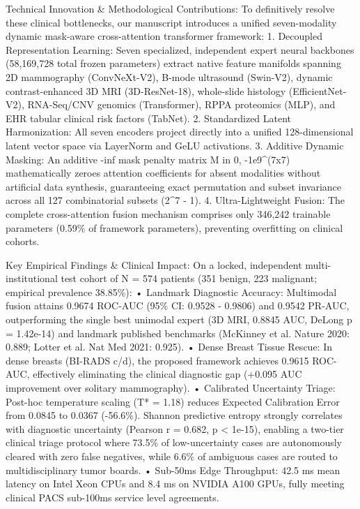 \documentclass[11pt]{article}
\begin{document}
Technical Innovation \& Methodological Contributions:
To definitively resolve these clinical bottlenecks, our manuscript introduces a unified seven-modality dynamic mask-aware cross-attention transformer framework:
1. Decoupled Representation Learning: Seven specialized, independent expert neural backbones (58,169,728 total frozen parameters) extract native feature manifolds spanning 2D mammography (ConvNeXt-V2), B-mode ultrasound (Swin-V2), dynamic contrast-enhanced 3D MRI (3D-ResNet-18), whole-slide histology (EfficientNet-V2), RNA-Seq/CNV genomics (Transformer), RPPA proteomics (MLP), and EHR tabular clinical risk factors (TabNet).
2. Standardized Latent Harmonization: All seven encoders project directly into a unified 128-dimensional latent vector space via LayerNorm and GeLU activations.
3. Additive Dynamic Masking: An additive -inf mask penalty matrix M in {0, -1e9}^(7x7) mathematically zeroes attention coefficients for absent modalities without artificial data synthesis, guaranteeing exact permutation and subset invariance across all 127 combinatorial subsets (2^7 - 1).
4. Ultra-Lightweight Fusion: The complete cross-attention fusion mechanism comprises only 346,242 trainable parameters (0.59\% of framework parameters), preventing overfitting on clinical cohorts.

Key Empirical Findings \& Clinical Impact:
On a locked, independent multi-institutional test cohort of N = 574 patients (351 benign, 223 malignant; empirical prevalence 38.85\%):
• Landmark Diagnostic Accuracy: Multimodal fusion attains 0.9674 ROC-AUC (95\% CI: 0.9528 - 0.9806) and 0.9542 PR-AUC, outperforming the single best unimodal expert (3D MRI, 0.8845 AUC, DeLong p = 1.42e-14) and landmark published benchmarks (McKinney et al. Nature 2020: 0.889; Lotter et al. Nat Med 2021: 0.925).
• Dense Breast Tissue Rescue: In dense breasts (BI-RADS c/d), the proposed framework achieves 0.9615 ROC-AUC, effectively eliminating the clinical diagnostic gap (+0.095 AUC improvement over solitary mammography).
• Calibrated Uncertainty Triage: Post-hoc temperature scaling (T* = 1.18) reduces Expected Calibration Error from 0.0845 to 0.0367 (-56.6\%). Shannon predictive entropy strongly correlates with diagnostic uncertainty (Pearson r = 0.682, p < 1e-15), enabling a two-tier clinical triage protocol where 73.5\% of low-uncertainty cases are autonomously cleared with zero false negatives, while 6.6\% of ambiguous cases are routed to multidisciplinary tumor boards.
• Sub-50ms Edge Throughput: 42.5 ms mean latency on Intel Xeon CPUs and 8.4 ms on NVIDIA A100 GPUs, fully meeting clinical PACS sub-100ms service level agreements.
\end{document}

